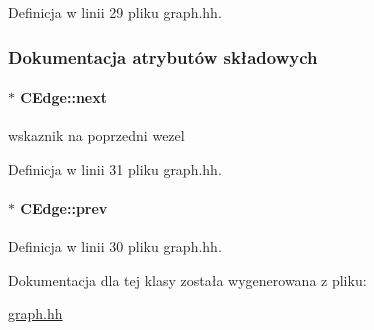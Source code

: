 Definicja w linii 29 pliku graph.\+hh.



\subsubsection{Dokumentacja atrybutów składowych}
\hypertarget{class_c_edge_ad1ee614fba28429ff44c5c793676cbd4}{}
\paragraph[{next}]{$\ast$ C\+Edge\+::next\hspace{0.3cm}{\ttfamily [private]}}\label{class_c_edge_ad1ee614fba28429ff44c5c793676cbd4}
wskaznik na poprzedni wezel 

Definicja w linii 31 pliku graph.\+hh.

\hypertarget{class_c_edge_a6028b71c45755a0f37cd6e240b357bac}{}
\paragraph[{prev}]{$\ast$ C\+Edge\+::prev\hspace{0.3cm}{\ttfamily [private]}}\label{class_c_edge_a6028b71c45755a0f37cd6e240b357bac}


Definicja w linii 30 pliku graph.\+hh.



Dokumentacja dla tej klasy została wygenerowana z pliku\+:\begin{DoxyCompactItemize}
\item 
\hyperlink{graph_8hh}{graph.\+hh}\end{DoxyCompactItemize}
